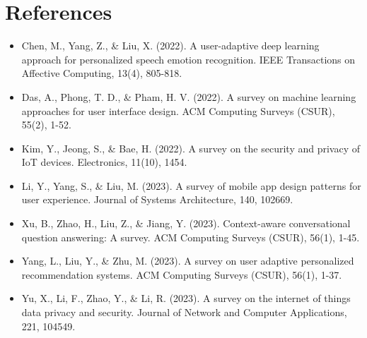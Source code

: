 \documentclass[12pt]{article}
\begin{document}
\section*{References}
\begin{itemize}
  \item Chen, M., Yang, Z., \& Liu, X. (2022). A user-adaptive deep learning approach for personalized speech emotion recognition. IEEE Transactions on Affective Computing, 13(4), 805-818.
  
  \item Das, A., Phong, T. D., \& Pham, H. V. (2022). A survey on machine learning approaches for user interface design. ACM Computing Surveys (CSUR), 55(2), 1-52.
  
  \item Kim, Y., Jeong, S., \& Bae, H. (2022). A survey on the security and privacy of IoT devices. Electronics, 11(10), 1454.
  
  \item Li, Y., Yang, S., \& Liu, M. (2023). A survey of mobile app design patterns for user experience. Journal of Systems Architecture, 140, 102669.
  
  \item Xu, B., Zhao, H., Liu, Z., \& Jiang, Y. (2023). Context-aware conversational question answering: A survey. ACM Computing Surveys (CSUR), 56(1), 1-45.
  
  \item Yang, L., Liu, Y., \& Zhu, M. (2023). A survey on user adaptive personalized recommendation systems. ACM Computing Surveys (CSUR), 56(1), 1-37.
  
  \item Yu, X., Li, F., Zhao, Y., \& Li, R. (2023). A survey on the internet of things data privacy and security. Journal of Network and Computer Applications, 221, 104549.
\end{itemize}
\end{document}

